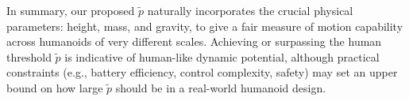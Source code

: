 



In summary, our proposed $\tilde{p}$ naturally incorporates the crucial physical parameters: height, mass, and gravity, to give a fair measure of motion capability across humanoids of very different scales. 
Achieving or surpassing the human threshold $\tilde{p}$ is indicative of human-like dynamic potential, although practical constraints (e.g., battery efficiency, control complexity, safety) may set an upper bound on how large $\tilde{p}$ should be in a real-world humanoid design.








